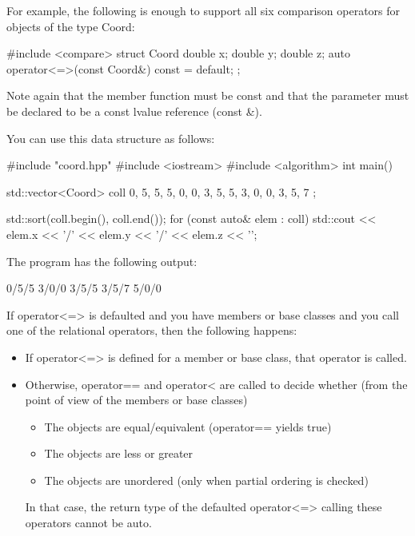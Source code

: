 For example, the following is enough to support all six comparison operators for objects of the type Coord:


\begin{cpp}
#include <compare>
struct Coord {
	double x{};
	double y{};
	double z{};
	auto operator<=>(const Coord&) const = default;
};
\end{cpp}

Note again that the member function must be const and that the parameter must be declared to be a const lvalue reference (const \&).

You can use this data structure as follows:


\begin{cpp}
#include "coord.hpp"
#include <iostream>
#include <algorithm>
int main()
{
	std::vector<Coord> coll{ {0, 5, 5}, {5, 0, 0}, {3, 5, 5},
							 {3, 0, 0}, {3, 5, 7} };
							 
	std::sort(coll.begin(), coll.end());
	for (const auto& elem : coll) {
		std::cout << elem.x << '/' << elem.y << '/' << elem.z << '\n';
	}
}
\end{cpp}

The program has the following output:

\begin{shell}
0/5/5
3/0/0
3/5/5
3/5/7
5/0/0
\end{shell}


If operator<=> is defaulted and you have members or base classes and you call one of the relational operators, then the following happens:

\begin{itemize}
\item
If operator<=> is defined for a member or base class, that operator is called.

\item
Otherwise, operator== and operator< are called to decide whether (from the point of view of the members or base classes)

\begin{itemize}
\item
The objects are equal/equivalent (operator== yields true)

\item
The objects are less or greater

\item
The objects are unordered (only when partial ordering is checked)
\end{itemize}

In that case, the return type of the defaulted operator<=> calling these operators cannot be auto.
\end{itemize}

